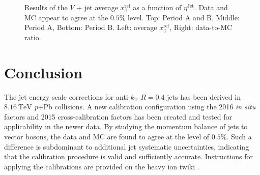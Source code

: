 \documentclass[NOTE, atlasdraft=true, texlive=2016, USenglish]{\ATLASLATEXPATH atlasdoc}
\begin{document}
\begin{figure}[htbp]
	\centering
	\\
	\\
	\caption{Results of the $V$ + jet average $x_{\text{J}}^{\text{ref}}$ as a function of $\eta^{\text{Jet}}$. Data and MC appear to agree at the $0.5\%$ level. Top: Period A and B, Middle: Period A, Bottom: Period B. Left: average $x_{\text{J}}^{\text{ref}}$, Right: data-to-MC ratio.}
	\label{fig:v_xjref_dataOverMC_eta}
\end{figure}


\section{Conclusion}
\label{sec:conclusion}

The jet energy scale corrections for anti-$k_{\text{T}}$ $R=0.4$ jets has been derived in $\SI{8.16}{\TeV}$ \textit{p}+Pb collisions.   A new calibration configuration using the 2016 \textit{in situ} factors and 2015 cross-calibration factors has been created and tested for applicability in the newer data. By studying the momentum balance of jets to vector bosons, the data and MC are found to agree at the level of $0.5\%$. Such a difference is subdominant to additional jet systematic uncertainties, indicating that the calibration procedure is valid and sufficiently accurate. Instructions for applying the calibrations are provided on the heavy ion twiki \cite{HIRun2JESdata2016}.
\end{document}
